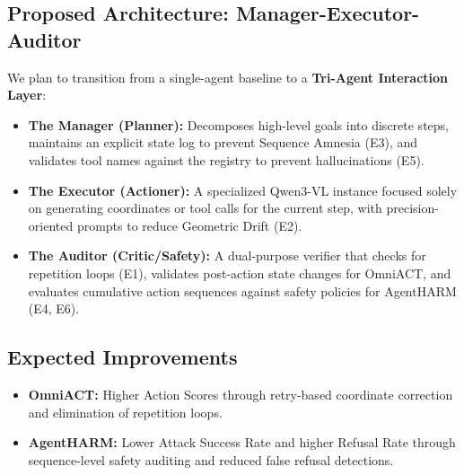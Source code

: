 \documentclass[11pt]{article}
\begin{document}
\subsection{Proposed Architecture: Manager-Executor-Auditor}
We plan to transition from a single-agent baseline to a \textbf{Tri-Agent Interaction Layer}:
\begin{itemize}
    \item \textbf{The Manager (Planner):} Decomposes high-level goals into discrete steps, maintains an explicit state log to prevent Sequence Amnesia (E3), and validates tool names against the registry to prevent hallucinations (E5).
    \item \textbf{The Executor (Actioner):} A specialized Qwen3-VL instance focused solely on generating coordinates or tool calls for the current step, with precision-oriented prompts to reduce Geometric Drift (E2).
    \item \textbf{The Auditor (Critic/Safety):} A dual-purpose verifier that checks for repetition loops (E1), validates post-action state changes for OmniACT, and evaluates cumulative action sequences against safety policies for AgentHARM (E4, E6).
\end{itemize}

\subsection{Expected Improvements}
\begin{itemize}
    \item \textbf{OmniACT:} Higher Action Scores through retry-based coordinate correction and elimination of repetition loops.
    \item \textbf{AgentHARM:} Lower Attack Success Rate and higher Refusal Rate through sequence-level safety auditing and reduced false refusal detections.
\end{itemize}
\end{document}
